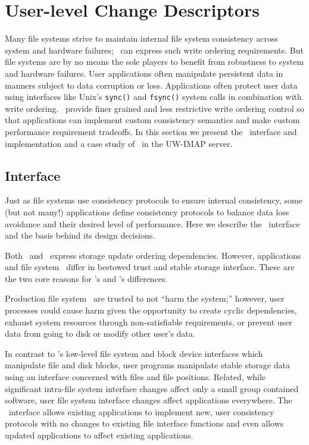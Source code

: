 \section{User-level Change Descriptors}
\label{sec:opgroup}
Many file systems strive to maintain internal file system consistency
across system and hardware failures; \chdescs\ can express such write
ordering requirements. But file systems are by no means the sole
players to benefit from robustness to system and hardware failures.
User applications often manipulate persistent data in manners subject
to data corruption or loss. Applications often protect user data using
interfaces like Unix's \texttt{sync()} and \texttt{fsync()} system
calls in combination with write ordering.  \Opgroups\ provide finer
grained and less restrictive write ordering control so that
applications can implement custom consistency semantics and make
custom performance requirement tradeoffs. In this section we present
the \opgroup\ interface and implementation and a case study of
\opgroups\ in the UW-IMAP server.

\subsection{Interface}
\label{sec:opgroup:interface}
Just as file systems use consistency protocols to ensure internal
consistency, some (but not many!) applications define consistency
protocols to balance data loss avoidance and their desired level of
performance. Here we describe the \opgroup\ interface and the basis
behind its design decisions.

Both \opgroups\ and \chdescs\ express storage update ordering
dependencies. However, applications and file system \modules\ differ
in bestowed trust and stable storage interface. These are the two core
reasons for \opgroup{}'s and \chdesc{}'s differences.

Production file system \modules\ are trusted to not ``harm the
system;'' however, user processes could cause harm given the
opportunity to create cyclic dependencies, exhaust system resources
through non-satisfiable requirements, or prevent user data from going
to disk or modify other user's data.

In contrast to \Kudos{}'s low-level file system and block device
interfaces which manipulate file and disk blocks, user programs
manipulate stable storage data using an interface concerned with files
and file positions.
%
Related, while significant intra-file system interface changes affect
only a small group contained software, user file system interface
changes affect applications everywhere. The \opgroup\ interface allows
existing applications to implement new, user consistency protocols
with no changes to existing file interface functions and even allows
updated applications to affect existing applications.


